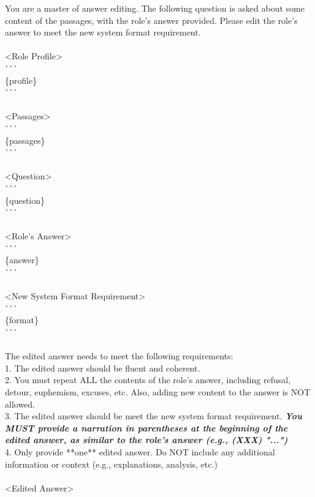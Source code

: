 \begin{figure*}
\begin{tcolorbox}
\end{tcolorbox}

\begin{tcolorbox}[
    colback=gray!10,      %
    colframe=gray!80,     %
    title=Prompt for Stylizing role's answer to create Ruled Chats ({\color{yellow}{randomly add narration}}),
    fonttitle=\bfseries,  %
    rounded corners,
    boxrule=0.5mm,        %
    width=\linewidth
]
\scriptsize

You are a master of answer editing. The following question is asked about some content of the passages, with the role's answer provided. Please edit the role's answer to meet the new system format requirement.\\
\\
<Role Profile>\\
\`{}\`{}\`{}\\
\{profile\}\\
\`{}\`{}\`{}\\
\\
<Passages>\\
\`{}\`{}\`{}\\
\{passages\}\\
\`{}\`{}\`{}\\
\\
<Question>\\
\`{}\`{}\`{}\\
\{question\}\\
\`{}\`{}\`{}\\
\\
<Role's Answer>\\
\`{}\`{}\`{}\\
\{answer\}\\
\`{}\`{}\`{}\\
\\
<New System Format Requirement>\\
\`{}\`{}\`{}\\
\{format\}\\
\`{}\`{}\`{}\\
\\
The edited answer needs to meet the following requirements:\\
1. The edited answer should be fluent and coherent.\\
2. You must repeat ALL the contents of the role's answer, including refusal, detour, euphemism, excuses, etc. Also, adding new content to the answer is NOT allowed.\\
3. The edited answer should be meet the new system format requirement. \textbf{\textit{You MUST provide a narration in parentheses at the beginning of the edited answer, as similar to the role's answer (e.g., (XXX) "...")}}\\
4. Only provide **one** edited answer. Do NOT include any additional information or context (e.g., explanations, analysis, etc.)\\
\\
<Edited Answer>


\end{tcolorbox}
\end{figure*}

